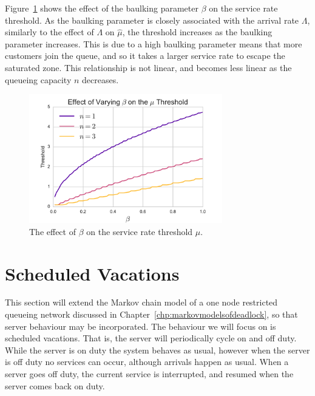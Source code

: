 \documentclass{article}
\begin{document}
Figure~\ref{fig:betathreshold} shows the effect of the baulking parameter $\beta$ on the service rate threshold.
As the baulking parameter is closely associated with the arrival rate $\Lambda$,
similarly to the effect of $\Lambda$ on $\hat{\mu}$, the threshold increases as
the baulking parameter increases. This is due to a high baulking parameter means that more customers join the queue, and so it takes a larger service rate to escape the saturated zone. This relationship is not linear, and becomes less linear as the queueing capacity $n$ decreases.

\begin{figure}[!htbp]
  \begin{center}
    \includegraphics[width=0.75\textwidth]{img/thresholdbeta_plot}
  \end{center}
  \caption{The effect of $\beta$ on the service rate threshold $\hat{\mu}$.}
  \label{fig:betathreshold}
\end{figure}



\section{Scheduled Vacations}

This section will extend the Markov chain model of a one node restricted queueing network discussed in Chapter~\ref{chp:markovmodelsofdeadlock}, so that server behaviour may be incorporated.
The behaviour we will focus on is scheduled vacations.
That is, the server will periodically cycle on and off duty. While the server is on duty the system behaves as usual, however when the server is off duty no services can occur, although arrivals happen as usual. When a server goes off duty, the current service is interrupted, and resumed when the server comes back on duty.
\end{document}
